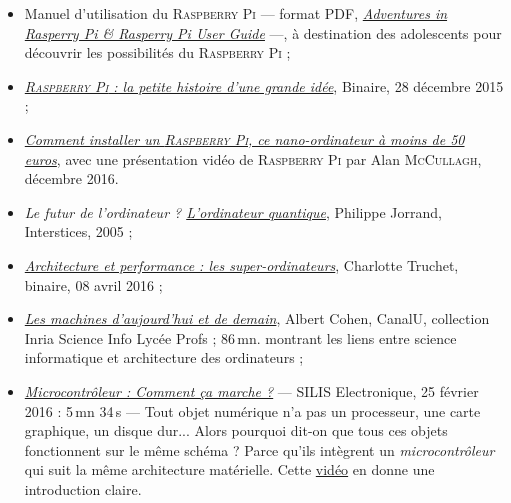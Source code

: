 \begin{gofurther}[after skip=2pt]
\textsc{}
\begin{itemize}\jazzitem
\item Manuel d’utilisation du \textsc{Raspberry Pi} --- format PDF, \href{./Documents/Chapter01/docI-01-raspberry-pi-adventures.pdf}{\textit{Adventures in Rasperry Pi \& Rasperry Pi User Guide}} ---, à destination des adolescents pour découvrir les possibilités du \textsc{Raspberry Pi} ;
\item \href{http://binaire.blog.lemonde.fr/2015/12/28/raspberry-pi-la-petite-histoire-dune-grande-idee/}{\textit{\textsc{Raspberry Pi} : la petite histoire d’une grande idée}}, Binaire, 28 décembre 2015 ;
\item \href{https://www.france24.com/fr/20161225-comment-installer-raspberry-pi-nano-ordinateur-a-moins-50-euros}{\textit{Comment installer un \textsc{Raspberry Pi}, ce nano-ordinateur à moins de 50 euros}}, avec une présentation vidéo de \textsc{Raspberry Pi} par Alan \textsc{McCullagh}, décembre 2016.
\end{itemize}

\smallskip
\textsc{}
\begin{itemize}\jazzitem
\item \textit{Le futur de l'ordinateur ? \href{https://interstices.info/vers-lordinateur-quantique-un-defi-scientifique-majeur-pour-les-prochaines-decennies/}{L'ordinateur quantique}}, Philippe Jorrand, Interstices, 2005 ;
\item \href{http://binaire.blog.lemonde.fr/2016/04/08/sil-vous-plait-dessine-moi-un-superordinateur/}{\textit{Architecture et performance : les super-ordinateurs}}, Charlotte Truchet, binaire, 08 avril 2016 ;
\item \href{https://www.canal-u.tv/video/inria/les_machines_d_aujourd_hui_et_de_demain.6490}{\textit{Les machines d'aujourd'hui et de demain}}, Albert Cohen,  CanalU, collection Inria Science Info Lycée Profs ; 86\,mn. montrant les liens entre science informatique et architecture des ordinateurs ;
\item \href{https://www.youtube.com/watch?v=U9T0fjFyVow}{\textit{Microcontrôleur : Comment ça marche ?}} --- SILIS Electronique, 25 février 2016 : 5\,mn 34\,s ---
Tout objet numérique n'a pas un processeur, une carte graphique, un disque dur... Alors pourquoi dit-on que tous ces objets fonctionnent sur le même schéma ? Parce qu'ils intègrent un \emph{microcontrôleur} qui suit la même architecture matérielle. Cette \href{https://www.youtube.com/watch?v=U9T0fjFyVow}{vidéo} en donne une introduction claire.
\end{itemize}
\end{gofurther}


